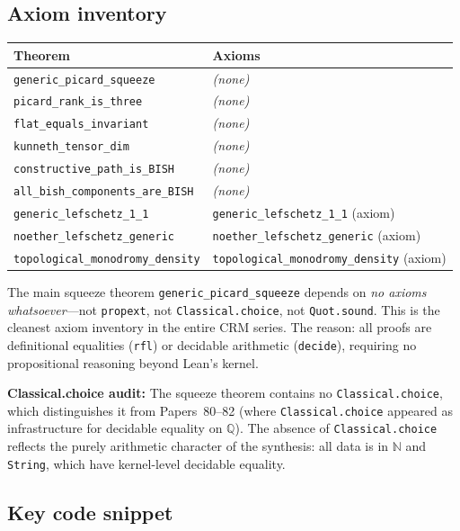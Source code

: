\documentclass[11pt]{article}
\theoremstyle{plain}
\theoremstyle{definition}
\theoremstyle{remark}
\newcommand{\N}{\mathbb{N}}
\newcommand{\Q}{\mathbb{Q}}
\begin{document}
\subsection{Axiom inventory}

\begin{center}
\renewcommand{\arraystretch}{1.05}
\begin{tabular}{@{}lp{7cm}@{}}
\toprule
Theorem & Axioms \\
\midrule
\texttt{generic\_picard\_squeeze} & \emph{(none)} \\
\texttt{picard\_rank\_is\_three} & \emph{(none)} \\
\texttt{flat\_equals\_invariant} & \emph{(none)} \\
\texttt{kunneth\_tensor\_dim} & \emph{(none)} \\
\texttt{constructive\_path\_is\_BISH} & \emph{(none)} \\
\texttt{all\_bish\_components\_are\_BISH} & \emph{(none)} \\
\midrule
\texttt{generic\_lefschetz\_1\_1} & \texttt{generic\_lefschetz\_1\_1} (axiom) \\
\texttt{noether\_lefschetz\_generic} & \texttt{noether\_lefschetz\_generic} (axiom) \\
\texttt{topological\_monodromy\_density} & \texttt{topological\_monodromy\_density} (axiom) \\
\bottomrule
\end{tabular}
\end{center}

The main squeeze theorem \texttt{generic\_picard\_squeeze} depends on \emph{no axioms whatsoever}---not \texttt{propext}, not \texttt{Classical.choice}, not \texttt{Quot.sound}.
This is the cleanest axiom inventory in the entire CRM series.
The reason: all proofs are definitional equalities (\texttt{rfl}) or decidable arithmetic (\texttt{decide}), requiring no propositional reasoning beyond Lean's kernel.

\textbf{Classical.choice audit:} The squeeze theorem contains no \texttt{Classical.choice}, which distinguishes it from Papers~80--82 (where \texttt{Classical.choice} appeared as infrastructure for decidable equality on $\Q$).
The absence of \texttt{Classical.choice} reflects the purely arithmetic character of the synthesis: all data is in $\N$ and \texttt{String}, which have kernel-level decidable equality.

\subsection{Key code snippet}
\end{document}
